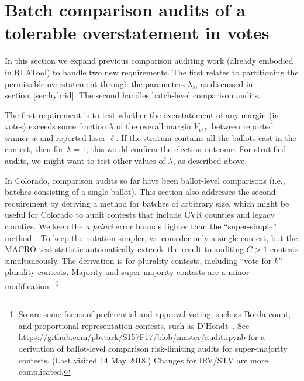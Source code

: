 \section{Batch comparison audits of a tolerable overstatement in votes}
\label{sec:comparisonError}

In this section we expand previous comparison auditing work (already embodied in RLATool) to handle two new requirements.  
The first relates to partitioning the permissible overstatement
through the parameters $\lambda_s$, as discussed in section~\ref{sec:hybrid}. 
The second handles batch-level comparison audits.

The first requirement is to test whether the overstatement of any margin
(in votes) exceeds some fraction $\lambda$ of the overall margin $V_{w\ell}$ between
reported winner $w$ and reported loser $\ell$.
If the stratum contains all the ballots cast in the contest, then for $\lambda = 1$, this 
would confirm the election outcome.
For stratified audits, we might want to test other values of $\lambda$, as described above.

In Colorado, comparison audits so far have been ballot-level comparisons
(i.e., batches consisting of a single ballot). 
This section also addresses the second requirement by deriving a method for batches of arbitrary size, which might be useful
for Colorado to audit contests that include CVR counties and legacy counties.
We keep the \emph{a priori} error bounds tighter than the ``super-simple'' 
method~\cite{stark10d}.
To keep the notation simpler, we consider only a single contest, but the 
MACRO test statistic \cite{stark09c,stark10d} automatically extends the result to 
auditing $C>1$ contests simultaneously.
The derivation is for plurality contests, including ``vote-for-$k$'' plurality contests.
Majority and super-majority contests are a minor 
modification~\cite{stark08a}.\footnote{%
  So are some forms of preferential and approval voting, such as Borda count, and
  proportional representation contests, such as D'Hondt~\cite{starkTeague14}.
  See \url{https://github.com/pbstark/S157F17/blob/master/audit.ipynb} for a derivation
  of ballot-level comparison risk-limiting audits for super-majority contests. (Last visited 14 May 2018.)
  Changes for IRV/STV are more complicated.
}

